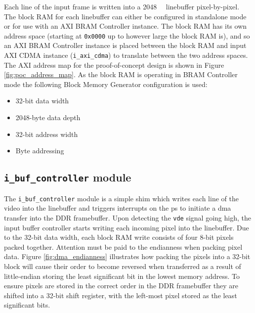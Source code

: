Each line of the input frame is written into a \SI{2048}{\kilo\byte} linebuffer pixel-by-pixel. The block RAM for each linebuffer can either be configured in standalone mode or for use with an AXI BRAM Controller instance. The block RAM has its own address space (starting at \texttt{0x0000} up to however large the block RAM is), and so an AXI BRAM Controller instance is placed between the block RAM and input AXI CDMA instance (\texttt{i\_axi\_cdma}) to translate between the two address spaces. The AXI address map for the proof-of-concept design is shown in Figure \ref{fig:poc_address_map}. As the block RAM is operating in BRAM Controller mode the following Block Memory Generator configuration is used:
\begin{itemize}
  \item 32-bit data width
  \item 2048-byte data depth
  \item 32-bit address width
  \item Byte addressing
\end{itemize}

\subsection{\texttt{i\_buf\_controller} module}
The \texttt{i\_buf\_controller} module is a simple shim which writes each line of the video into the linebuffer and triggers interrupts on the \gls{ps} to initiate a \gls{dma} transfer into the DDR framebuffer. Upon detecting the \texttt{vde} signal going high, the input buffer controller starts writing each incoming pixel into the linebuffer. Due to the 32-bit data width, each block RAM write consists of four 8-bit pixels packed together. Attention must be paid to the endianness when packing pixel data. Figure \ref{fig:dma_endianness} illustrates how packing the pixels into a 32-bit block will cause their order to become reversed when transferred as a result of little-endian storing the least significant bit in the lowest memory address. To ensure pixels are stored in the correct order in the DDR framebuffer they are shifted into a 32-bit shift register, with the left-most pixel stored as the least significant bits.

